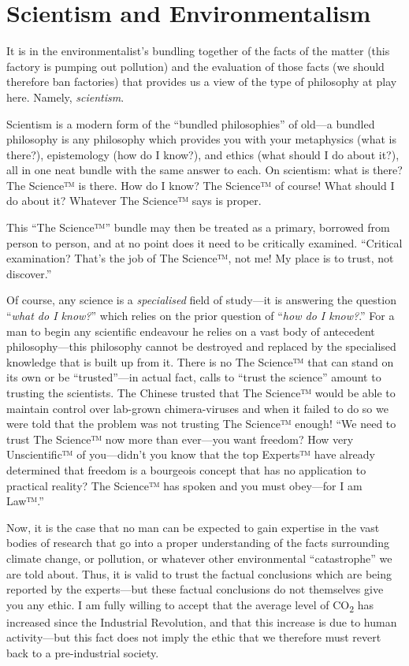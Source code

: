 \documentclass[11pt]{article}
\begin{document}
\section{Scientism and Environmentalism}
\label{sec:orgbc0cea4}
It is in the environmentalist's bundling together of the facts of the matter (this factory is pumping out pollution) and the evaluation of those facts (we should therefore ban factories) that provides us a view of the type of philosophy at play here. Namely, \emph{scientism}.

Scientism is a modern form of the ``bundled philosophies'' of old---a bundled philosophy is any philosophy which provides you with your metaphysics (what is there?), epistemology (how do I know?), and ethics (what should I do about it?), all in one neat bundle with the same answer to each. On scientism: what is there? The Science™ is there. How do I know? The Science™ of course! What should I do about it? Whatever The Science™ says is proper.

This ``The Science™'' bundle may then be treated as a primary, borrowed from person to person, and at no point does it need to be critically examined. ``Critical examination? That’s the job of The Science™, not me! My place is to trust, not discover.''

Of course, any science is a \emph{specialised} field of study---it is answering the question ``\emph{what do I know?}'' which relies on the prior question of ``\emph{how do I know?}.'' For a man to begin any scientific endeavour he relies on a vast body of antecedent philosophy---this philosophy cannot be destroyed and replaced by the specialised knowledge that is built up from it. There is no The Science™ that can stand on its own or be ``trusted''---in actual fact, calls to ``trust the science'' amount to trusting the scientists. The Chinese trusted that The Science™ would be able to maintain control over lab-grown chimera-viruses and when it failed to do so we were told that the problem was not trusting The Science™ enough! ``We need to trust The Science™ now more than ever---you want freedom? How very Unscientific™ of you---didn’t you know that the top Experts™ have already determined that freedom is a bourgeois concept that has no application to practical reality? The Science™ has spoken and you must obey---for I am Law™.''

Now, it is the case that no man can be expected to gain expertise in the vast bodies of research that go into a proper understanding of the facts surrounding climate change, or pollution, or whatever other environmental ``catastrophe'' we are told about. Thus, it is valid to trust the factual conclusions which are being reported by the experts---but these factual conclusions do not themselves give you any ethic. I am fully willing to accept that the average level of CO\textsubscript{2} has increased since the Industrial Revolution, and that this increase is due to human activity---but this fact does not imply the ethic that we therefore must revert back to a pre-industrial society.
\end{document}
